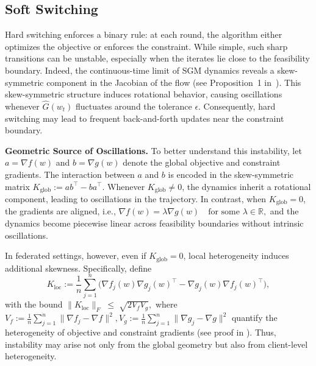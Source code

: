 \documentclass{article} %
\newtheorem{remark}{Remark}[]
\begin{document}
\subsection{Soft Switching}
\label{sec:soft-switching-analysis}
Hard switching enforces a binary rule: at each round, the algorithm either optimizes the objective or enforces the constraint. While simple, such sharp transitions can be unstable, especially when the iterates lie close to the feasibility boundary. Indeed, the continuous-time limit of SGM dynamics reveals a skew-symmetric component in the Jacobian of the flow (see Proposition~1 in~\citet{upadhyay2025optimization}). This skew-symmetric structure induces rotational behavior, causing oscillations whenever $\hat{G}(w_t)$ fluctuates around the tolerance $\epsilon$. Consequently, hard switching may lead to frequent back-and-forth updates near the constraint boundary.

\noindent\textbf{Geometric Source of Oscillations.}  
To better understand this instability, let $a = \nabla f(w)$ and $b = \nabla g(w)$ denote the global objective and constraint gradients. The interaction between $a$ and $b$ is encoded in the skew-symmetric matrix
$
K_{\text{glob}} := ab^\top - ba^\top.
$
Whenever $K_{\text{glob}} \neq 0$, the dynamics inherit a rotational component, leading to oscillations in the trajectory. In contrast, when $K_{\text{glob}} = 0$, the gradients are aligned, i.e.,
$
\nabla f(w) = \lambda \nabla g(w) \quad \text{for some } \lambda \in \mathbb{R},$
and the dynamics become piecewise linear across feasibility boundaries without intrinsic oscillations.

In federated settings, however, even if $K_{\text{glob}}=0$, local heterogeneity induces additional skewness. Specifically, define
$$
K_{\text{loc}} := \frac{1}{n} \sum_{j=1}^{n} \big( \nabla f_j(w) \nabla g_j(w)^\top - \nabla g_j(w) \nabla f_j(w)^\top \big),
$$
with the bound
$
\|K_{\text{loc}}\|_F \;\le\; \sqrt{2 V_f V_g},
$
where $V_f:=\frac{1}{n}\sum_{j=1}^n\|\nabla f_j - \nabla f\|^2, V_g:=\frac{1}{n}\sum_{j=1}^n\|\nabla g_j - \nabla g\|^2$ quantify the heterogeneity of objective and constraint gradients (see proof in ). Thus, instability may arise not only from the global geometry but also from client-level heterogeneity.
\end{document}
